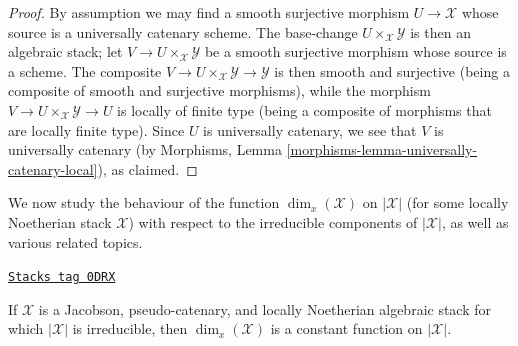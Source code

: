 \begin{proof}
By assumption we may find a smooth surjective morphism
$U \to \mathcal{X}$ whose source is a universally catenary scheme.
The base-change $U\times_{\mathcal{X}} \mathcal{Y}$ is then an algebraic
stack; let $V \to U\times_{\mathcal{X}} \mathcal{Y}$ be a smooth
surjective morphism whose source is a scheme.
The composite $V \to U\times_{\mathcal{X}} \mathcal{Y} \to \mathcal{Y}$ is then
smooth and surjective (being a composite of smooth and
surjective morphisms), while the morphism $V \to U\times_{\mathcal{X}}
\mathcal{Y} \to U$ is locally of finite type (being a composite
of morphisms that are locally finite type).  Since $U$
is universally catenary, we see that $V$ is universally catenary
(by Morphisms, Lemma
\ref{morphisms-lemma-universally-catenary-local}),
as claimed.
\end{proof}

We now study the behaviour of the function $\dim_x(\mathcal{X})$ on
$|\mathcal{X}|$
(for some locally Noetherian stack $\mathcal{X}$) with respect to the
irreducible
components of $|\mathcal{X}|$, as well as various
related topics.

\begin{lemma}
\label{stacks-geometry-lemma-irreducible-implies-equidimensional}
\href{https://stacks.math.columbia.edu/tag/0DRX}{\texttt{Stacks tag 0DRX}}

If $\mathcal{X}$ is
a Jacobson, pseudo-catenary, and locally Noetherian  algebraic stack
for which $|\mathcal{X}|$ is irreducible,
then $\dim_x(\mathcal{X})$ is a constant function on $|\mathcal{X}|$.
\end{lemma}


